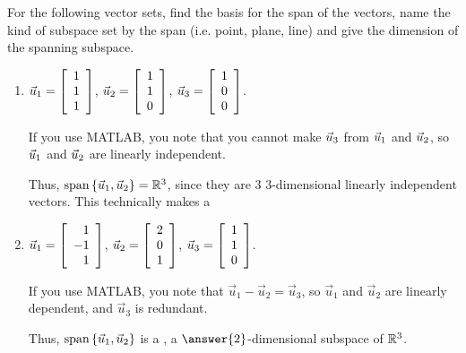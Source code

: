 \documentclass{ximera}
\begin{document}
\begin{exploration}
\begin{remark}
\end{remark}

\begin{example}

  For the following vector sets, find the basis for the span of the vectors, name the kind of subspace set by the span (i.e. point, plane, line) and give the dimension of the spanning subspace.

  \begin{enumerate}

    \item $\vect{u}_1=\startmat{r} 1 \\ 1 \\ 1 \stopmat$, $\vect{u}_2=\startmat{r} 1 \\ 1 \\ 0 \stopmat$, $\vect{u}_3=\startmat{r} 1 \\ 0 \\ 0 \stopmat$.
    
    \begin{solution}
    
      If you use MATLAB, you note that you cannot make $\vect{u}_3$ from $\vect{u}_1$ and $\vect{u}_2$, so $\vect{u}_1$ and $\vect{u}_2$ are linearly independent. 
      
      Thus, $\sspan\set{\vect{u}_1,\vect{u}_2}=\R^3$, since they are 3 $3$-dimensional linearly independent vectors. This technically makes a 

    \end{solution}

    \item $\vect{u}_1=\startmat{r} 1 \\ -1 \\ 1 \stopmat$, $\vect{u}_2=\startmat{r} 2 \\ 0 \\ 1 \stopmat$, $\vect{u}_3=\startmat{r} 1 \\ 1 \\ 0 \stopmat$.
    
    \begin{solution}
    
      If you use MATLAB, you note that $\vec{u}_1-\vec{u}_2=\vec{u}_3$, so $\vec{u}_1$ and $\vec{u}_2$ are linearly dependent, and $\vec{u}_3$ is redundant.
      
      Thus, $\sspan\set{\vect{u}_1,\vect{u}_2}$ is a , a $\answer{2}$-dimensional subspace of $\R^3$.


\end{solution}
\end{enumerate}
\end{example}
\end{exploration}
\end{document}
